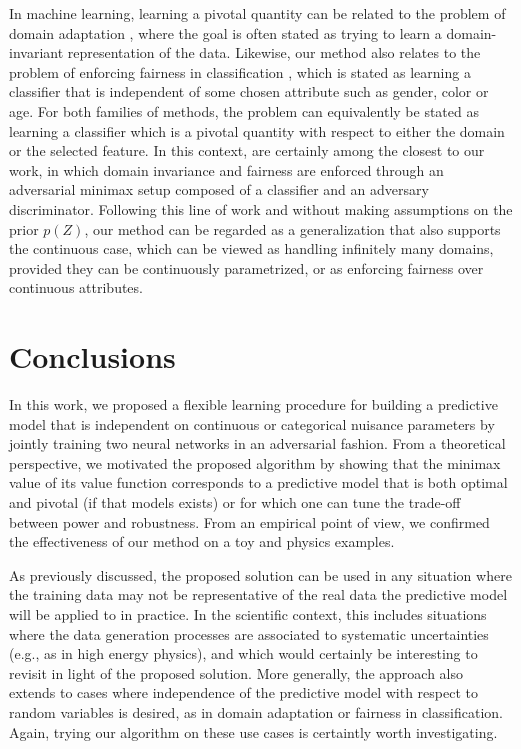 \documentclass[twocolumn,superscriptaddress,aps]{revtex4-1}
\theoremstyle{plain}
\begin{document}
In machine learning, learning a pivotal quantity can be related to the problem
of domain adaptation
\citep{blitzer2006domain,pan2011domain,gopalan2011domain,gong2013connecting,baktashmotlagh2013unsupervised,ajakan2014domain,ganin2014unsupervised},
where the goal is often stated as trying to learn a domain-invariant
representation of the data. Likewise, our method also relates to the problem of
enforcing fairness in classification \citep{zemel2013learning,feldman2015certifying,EdwardsS15,zafar2015fairness}, which
is stated as learning a classifier that is independent of some chosen attribute
such as gender, color or age. For both families of methods, the problem can
equivalently be stated as learning a classifier which is a pivotal quantity with
respect to either the domain or the selected feature. In this context,
\citep{ganin2014unsupervised,EdwardsS15} are certainly among the closest to our
work, in which domain invariance and fairness are enforced through an
adversarial minimax setup composed of a classifier and an adversary
discriminator. Following this line of work and without making assumptions on the prior $p(Z)$, our method can be regarded as a
generalization that also supports the continuous case, which can be viewed as
handling infinitely many domains, provided they can be continuously
parametrized, or as enforcing fairness over continuous attributes.



\section{Conclusions}
\label{sec:conclusions}

In this work, we proposed a flexible learning procedure for building a
predictive model that is independent on continuous or categorical nuisance
parameters by jointly training two neural networks in an adversarial fashion.
From a theoretical perspective, we motivated the proposed algorithm by showing
that the minimax value  of its value function corresponds to a predictive model
that is both optimal and pivotal (if that models exists) or for which one can
tune the trade-off between power and robustness. From an empirical point of
view, we confirmed the effectiveness of our method on a toy and physics examples.

As previously discussed, the proposed solution can be used in any situation
where the training data may not be representative of the real data the
predictive model will be applied to in practice. In the scientific context, this
includes situations where the data generation processes are associated to
systematic uncertainties (e.g., as in high energy physics), and which would certainly be
 interesting to revisit in light of the proposed solution. More generally,
the approach also extends to cases where independence of the predictive
model with respect to random variables is desired, as in domain adaptation
or fairness in classification. Again, trying our algorithm on these
use cases is certaintly worth investigating.
\end{document}

